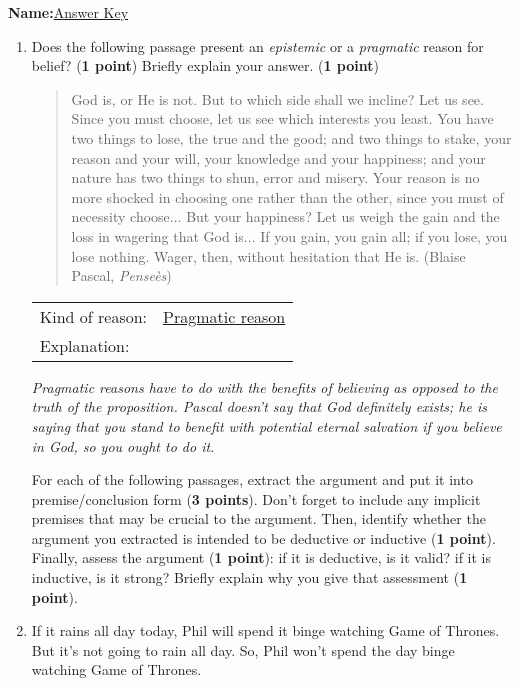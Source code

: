 \documentclass[10pt]{article}
\begin{document}
\textbf{Name:}\underline{Answer Key}



\begin{enumerate}
  \item Does the following passage present an \textit{epistemic} or a \textit{pragmatic} reason for belief? (\textbf{1 point}) Briefly explain your answer. (\textbf{1 point})
  
  \begin{quotation}
    God is, or He is not. But to which side shall we incline? Let us see. Since you must choose, let us see which interests you least. You have two things to lose, the true and the good; and two things to stake, your reason and your will, your knowledge and your happiness; and your nature has two things to shun, error and misery. Your reason is no more shocked in choosing one rather than the other, since you must of necessity choose... But your happiness? Let us weigh the gain and the loss in wagering that God is... If you gain, you gain all; if you lose, you lose nothing. Wager, then, without hesitation that He is. (Blaise Pascal, \textit{Pense\`es})
  \end{quotation}
  
   \begin{tabular}{ll}
    Kind of reason: & \underline{Pragmatic reason} \\
    Explanation: & \\
  \end{tabular}
  
  \textit{Pragmatic reasons have to do with the benefits of believing as opposed to the truth of the proposition. Pascal doesn't say that God definitely exists; he is saying that you stand to benefit with potential eternal salvation if you believe in God, so you ought to do it.}
  

\vspace{.7in}
  
For each of the following passages, extract the argument and put it into premise/conclusion form (\textbf{3 points}). Don't forget to include any implicit premises that may be crucial to the argument. Then, identify whether the argument you extracted is intended to be deductive or inductive (\textbf{1 point}).  Finally, assess the argument (\textbf{1 point}): if it is deductive, is it valid?  if it is inductive, is it strong? Briefly explain why you give that assessment (\textbf{1 point}).
 
   \item If it rains all day today, Phil will spend it binge watching Game of Thrones. But it's not going to rain all day.  So, Phil won't spend the day binge watching Game of Thrones.
  

\end{enumerate}
\end{document}
